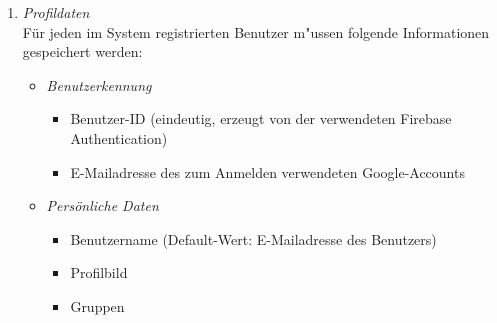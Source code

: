\documentclass[parskip=full]{scrartcl}
\def\threedigits#1{%
  \ifnum#1<100 0\fi
  \ifnum#1<10 0\fi
  \number#1}
\begin{document}
\begin{enumerate}[label={\textbf{/D\protect\threedigits{\theenumi}0/}}, leftmargin=*]
	\item \textit{Profildaten} \label{Profildaten} \\Für jeden im System registrierten Benutzer m"ussen folgende Informationen gespeichert werden:
		\begin{itemize}
			\item \textit{Benutzerkennung}
				\begin{itemize}
					\item Benutzer-ID (eindeutig, erzeugt von der verwendeten Firebase Authentication)
					\item E-Mailadresse des zum Anmelden verwendeten Google-Accounts
				\end{itemize}
			\item \textit{Persönliche Daten} \label{persönliche Daten} 
			\begin{itemize}
			\item \gls{Benutzername} (Default-Wert: E-Mailadresse des Benutzers)
			\item \colorbox{shadecolor}{Profilbild}
			\item Gruppen
		\end{itemize}
		\end{itemize}
	

\end{enumerate}
\end{document}
